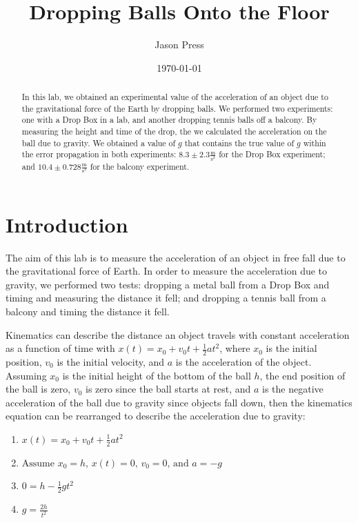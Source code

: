 \documentclass[12pt]{article}
\author{Jason Press}
\date{\today}
\title{Dropping Balls Onto the Floor}
\begin{document}
\maketitle
\begin{abstract}


In this lab, we obtained an experimental value of the acceleration of an object due to the gravitational force of the Earth by dropping balls. We performed two experiments: one with a Drop Box in a lab, and another dropping tennis balls off a balcony. By measuring the height and time of the drop, the we calculated the acceleration on the ball due to gravity. We obtained a value of \(g\) that contains the true value of \(g\) within the error propagation in both experiments:  \(8.3\pm2.3 \frac{\text{m}}{\text{s}^{2}}\) for the Drop Box experiment; and \(10.4\pm 0.728 \frac{\text{m}}{\text{s}^{2}}\) for the balcony experiment.
\end{abstract}
\section{Introduction}
\label{sec:org3b5bb02}

The aim of this lab is to measure the acceleration of an object in free fall due to the gravitational force of Earth. In order to measure the acceleration due to gravity, we performed two tests: dropping a metal ball from a Drop Box and timing and measuring the distance it fell; and dropping a tennis ball from a balcony and timing the distance it fell.

Kinematics can describe the distance an object travels with constant acceleration as a function of time with \(x\left(t\right) = x_{0} + v_{0}t + \frac{1}{2}at^{2}\), where \(x_{0}\) is the initial position, \(v_{0}\) is the initial velocity, and \(a\) is the acceleration of the object. Assuming \(x_{0}\) is the initial height of the bottom of the ball \(h\), the end position of the ball is zero, \(v_{0}\) is zero since the ball starts at rest, and \(a\) is the negative acceleration of the ball due to gravity since objects fall down, then the kinematics equation can be rearranged to describe the acceleration due to gravity:

\begin{enumerate}
\item \(x(t) = x_{0} + v_{0}t + \frac{1}{2}at^{2} \)
\item \( \text{Assume } x_{0} = h \text{, } x(t) = 0 \text{, } v_{0} = 0 \text{, and } a = -g \)
\item \(0 = h - \frac{1}{2} gt^{2} \)
\item \(g = \frac{2h}{t^{2}} \)
\end{enumerate}
\end{document}
